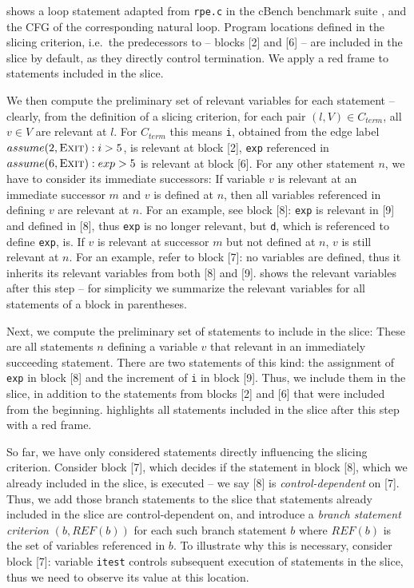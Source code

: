 \begin{example}
     shows a loop statement adapted from \texttt{rpe.c} in the cBench benchmark suite \cite{cBench}, and  the CFG of the corresponding natural loop. Program locations defined in the slicing criterion, i.e.\ the predecessors to \exit{} -- blocks [2] and [6] -- are included in the slice by default, as they directly control termination. We apply a red frame to statements included in the slice.

We then compute the preliminary set of relevant variables for each statement -- clearly, from the definition of a slicing criterion, for each pair $(l, V) \in C_{term}$, all $v \in V$ are relevant at $l$. For $C_{term}$ this means \texttt{i}, obtained from the edge label $assume(2,\textsc{Exit}): i > 5$, is relevant at block [2], \texttt{exp} referenced in $assume(6,\textsc{Exit}): exp > 5$ is relevant at block [6]. For any other statement $n$, we have to consider its immediate successors: If variable $v$ is relevant at an immediate successor $m$ and $v$ is defined at $n$, then all variables referenced in defining $v$ are relevant at $n$. For an example, see block [8]: \texttt{exp} is relevant in [9] and defined in [8], thus \texttt{exp} is no longer relevant, but \texttt{d}, which is referenced to define \texttt{exp}, is. If $v$ is relevant at successor $m$ but not defined at $n$, $v$ is still relevant at $n$. For an example, refer to block [7]: no variables are defined, thus it inherits its relevant variables from both [8] and [9].  shows the relevant variables after this step -- for simplicity we summarize the relevant variables for all statements of a block in parentheses.

Next, we compute the preliminary set of statements to include in the slice: These are all statements $n$ defining a variable $v$ that relevant in an immediately succeeding statement. There are two statements of this kind: the assignment of \texttt{exp} in block [8] and the increment of \texttt{i} in block [9]. Thus, we include them in the slice, in addition to the statements from blocks [2] and [6] that were included from the beginning.  highlights all statements included in the slice after this step with a red frame.


So far, we have only considered statements directly influencing the slicing criterion. Consider block [7], which decides if the statement in block [8], which we already included in the slice, is executed -- we say [8] is \emph{control-dependent} on [7]. Thus, we add those branch statements to the slice that statements already included in the slice are control-dependent on, and introduce a \emph{branch statement criterion} $(b, REF(b))$ for each such branch statement $b$ where $REF(b)$ is the set of variables referenced in $b$. To illustrate why this is necessary, consider block [7]: variable \texttt{itest} controls subsequent execution of statements in the slice, thus we need to observe its value at this location.


\end{example}
